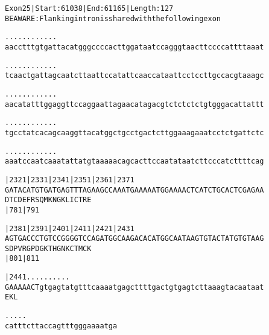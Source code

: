 \documentclass{article}
\begin{document}
\begin{alltt}
Exon 25 | Start: 61038 | End: 61165 | Length: 127
BE AWARE: Flanking intron is shared with the following exon

.    .    .    .    .    .    .    .    .    .    .    .
aacctttgtgattacatgggccccacttggataatccagggtaacttccccattttaaat



.    .    .    .    .    .    .    .    .    .    .    .
tcaactgattagcaatcttaattccatattcaaccataattcctccttgccacgtaaagc



.    .    .    .    .    .    .    .    .    .    .    .
aacatatttggaggttccaggaattagaacatagacgtctctctctgtgggacattattt



.    .    .    .    .    .    .    .    .    .    .    .
tgcctatcacagcaaggttacatggctgcctgactcttggaaagaaatcctctgattctc



.    .    .    .    .    .    .    .    .    .    .    .
aaatccaatcaaatattatgtaaaaacagcacttccaatataatcttcccatcttttcag



       |2321     |2331     |2341     |2351     |2361     |2371
GATACATGTGATGAGTTTAGAAGCCAAATGAAAAATGGAAAACTCATCTGCACTCGAGAA
D  T  C  D  E  F  R  S  Q  M  K  N  G  K  L  I  C  T  R  E
                           |781                          |791

       |2381     |2391     |2401     |2411     |2421     |2431
AGTGACCCTGTCCGGGGTCCAGATGGCAAGACACATGGCAATAAGTGTACTATGTGTAAG
S  D  P  V  R  G  P  D  G  K  T  H  G  N  K  C  T  M  C  K
                           |801                          |811

       |2441.    .    .    .    .    .    .    .    .    .
GAAAAACTgtgagtatgtttcaaaatgagcttttgactgtgagtcttaaagtacaataat
E  K  L


  .    .    .    .    .
catttcttaccagtttgggaaaatga


\end{alltt}
\newpage
\end{document}
